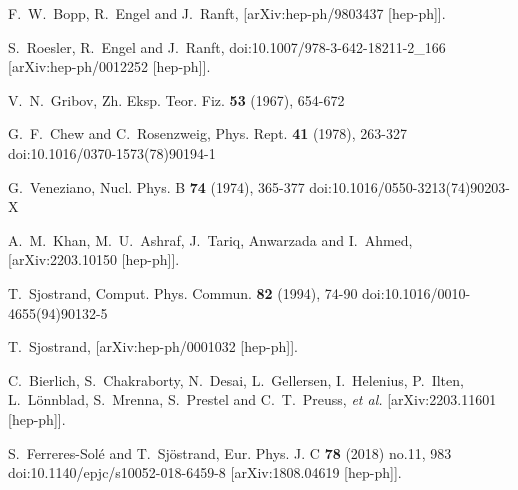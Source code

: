 \begin{thebibliography}{99}
F.~W.~Bopp, R.~Engel and J.~Ranft,
[arXiv:hep-ph/9803437 [hep-ph]].

S.~Roesler, R.~Engel and J.~Ranft,
doi:10.1007/978-3-642-18211-2\_166
[arXiv:hep-ph/0012252 [hep-ph]].

V.~N.~Gribov,
Zh. Eksp. Teor. Fiz. \textbf{53} (1967), 654-672


G.~F.~Chew and C.~Rosenzweig,
Phys. Rept. \textbf{41} (1978), 263-327
doi:10.1016/0370-1573(78)90194-1


G.~Veneziano,
Nucl. Phys. B \textbf{74} (1974), 365-377
doi:10.1016/0550-3213(74)90203-X

A.~M.~Khan, M.~U.~Ashraf, J.~Tariq, Anwarzada and I.~Ahmed,
[arXiv:2203.10150 [hep-ph]].

T.~Sjostrand,
Comput. Phys. Commun. \textbf{82} (1994), 74-90
doi:10.1016/0010-4655(94)90132-5

T.~Sjostrand,
[arXiv:hep-ph/0001032 [hep-ph]].

C.~Bierlich, S.~Chakraborty, N.~Desai, L.~Gellersen, I.~Helenius, P.~Ilten, L.~L\"onnblad, S.~Mrenna, S.~Prestel and C.~T.~Preuss, \textit{et al.}
[arXiv:2203.11601 [hep-ph]].

S.~Ferreres-Sol\'e and T.~Sj\"ostrand,
Eur. Phys. J. C \textbf{78} (2018) no.11, 983
doi:10.1140/epjc/s10052-018-6459-8
[arXiv:1808.04619 [hep-ph]].


\end{thebibliography}
